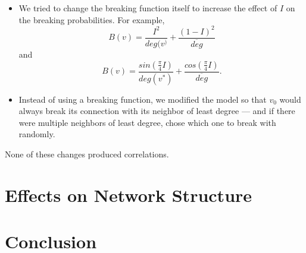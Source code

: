 \documentclass[a4paper,10pt]{article}
\begin{document}
\begin{itemize}

 \item We tried to change the breaking function itself to increase the effect of $I$ on the breaking probabilities. For example,
 \begin{equation}
  B(v) = \frac{I^2}{deg(v^)} + \frac{(1 - I)^2}{\overline{deg}}
 \end{equation}
and
 \begin{equation}
  B(v) = \frac{sin(\frac{\pi}{4}I)}{deg(v^*)} + \frac{cos(\frac{\pi}{4}I)}{\overline{deg}}.
 \end{equation}

 \item Instead of using a breaking function, we modified the model so that $v_0$ would always break its connection with its neighbor of least degree --- and if there were multiple neighbors of least degree, chose which one to break with randomly. 

\end{itemize}
 None of these changes produced correlations.

\section{Effects on Network Structure}

\section{Conclusion}
\end{document}
